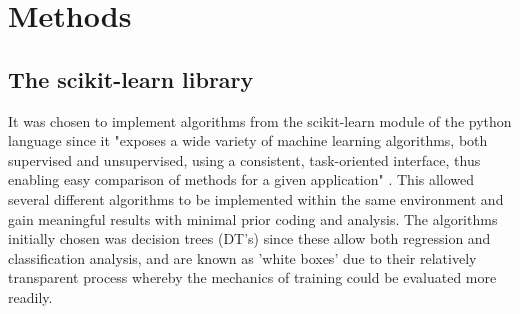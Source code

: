 \chapter{Methods}
\label{ch:methods}
\section{The scikit-learn library}It was chosen to implement algorithms from the scikit-learn module of the python language since it "exposes a wide variety of machine learning algorithms, both supervised and unsupervised, using a consistent, task-oriented interface, thus enabling easy comparison of methods for a given application" \cite{Pedregosa2012}. This allowed several different algorithms to be implemented within the same environment and gain meaningful results with minimal prior coding and analysis. The algorithms initially chosen was decision trees (DT's) since these allow both regression and classification analysis, and are known as 'white boxes' due to their relatively transparent process whereby the mechanics of training could be evaluated more readily. 

